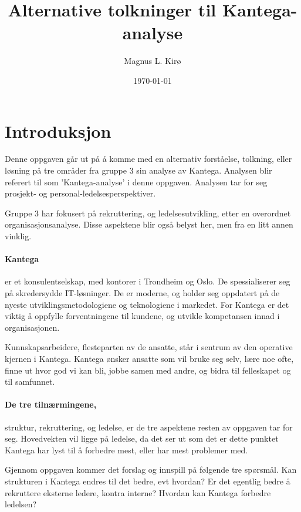 \documentclass[12pt, a4paper]{article}
\title{
	Alternative tolkninger til Kantega-analyse
}
\author{
	Magnus L. Kirø \\
}
\date{\today}
\begin{document}
\maketitle
{}

\tableofcontents
\newpage

\section{Introduksjon}
Denne oppgaven går ut på å komme med en alternativ
forståelse, tolkning, eller løsning på tre områder fra gruppe 3 sin analyse av
Kantega. Analysen blir referert til som 'Kantega-analyse' i denne oppgaven. 
Analysen tar for seg prosjekt- og personal-ledelsesperspektiver.

Gruppe 3 har fokusert på rekruttering, og ledelsesutvikling, etter en
overordnet organisasjonsanalyse. Disse aspektene blir også belyst her, men fra
en litt annen vinklig. 

\paragraph{Kantega} er et konsulentselskap, med kontorer i Trondheim og Oslo.
De spessialiserer seg på skredersydde IT-løsninger. De er moderne, og holder
seg oppdatert på de nyeste utviklingsmetodologiene og teknologiene i markedet.
For Kantega er det viktig å oppfylle forventningene til kundene, og utvikle
kompetansen innad i organisasjonen.   

Kunnskapsarbeidere, flesteparten av de ansatte,  står i sentrum av den operative
kjernen i Kantega. Kantega ønsker ansatte som vil bruke seg selv, lære noe
ofte, finne ut hvor god vi kan bli, jobbe samen med andre, og bidra til
felleskapet og til samfunnet.

\paragraph{De tre tilnærmingene,} struktur, rekruttering, og ledelse, er de tre
aspektene resten av oppgaven tar for seg. Hovedvekten vil ligge på ledelse, da
det ser ut som det er dette punktet Kantega har lyst til å forbedre mest, eller 
har mest problemer med. 

Gjennom oppgaven kommer det forslag og innspill på følgende tre spørsmål. Kan
strukturen i Kantega endres til det bedre, evt hvordan? Er det egentlig bedre
å rekruttere eksterne ledere, kontra interne? Hvordan kan Kantega forbedre ledelsen?
\end{document}
